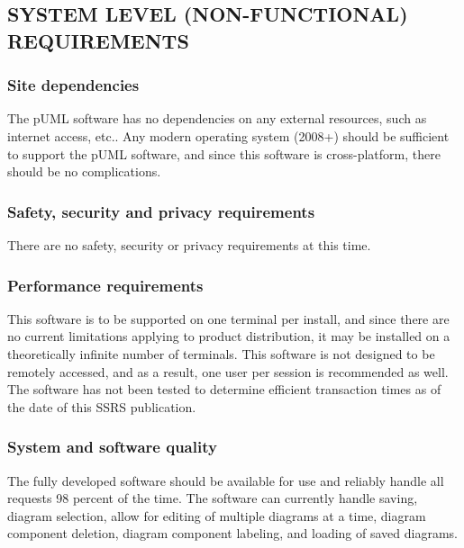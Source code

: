 \documentclass[twoside,letterpaper]{article}
\begin{document}
\subsection[SYSTEM LEVEL (NON{}-FUNCTIONAL)
REQUIREMENTS]{\rmfamily\bfseries
SYSTEM LEVEL (NON-FUNCTIONAL) REQUIREMENTS}

\subsubsection[Site dependencies]{\rmfamily\bfseries
Site dependencies}
{
The pUML software has no dependencies on any external resources, such as internet access, etc..
Any modern operating system (2008+) should be sufficient to support the pUML software,
and since this software is cross-platform, there should be no complications.
}

\subsubsection[Safety, security and privacy requirements]{\rmfamily\bfseries
Safety, security and privacy requirements}
{
There are no safety, security or privacy requirements at this time.
}

\subsubsection[Performance requirements]{\rmfamily\bfseries
Performance requirements}
{
This software is to be supported on one terminal per install, and since there are no current
 limitations applying to product distribution, it may be installed on a theoretically infinite 
number of terminals. This software is not designed to be remotely accessed, and as a result, 
one user per session is recommended as well.  The software has not been tested to determine 
efficient transaction times as of the date of this SSRS publication.
}

\subsubsection[System and software quality]{\rmfamily\bfseries System
and software quality}
{
The fully developed software should be available for use and reliably handle all requests 98 
percent of the time.  The software can currently handle saving, diagram selection, allow for 
editing of multiple diagrams at a time, diagram component deletion, diagram component labeling, 
and loading of saved diagrams.
}
\end{document}
